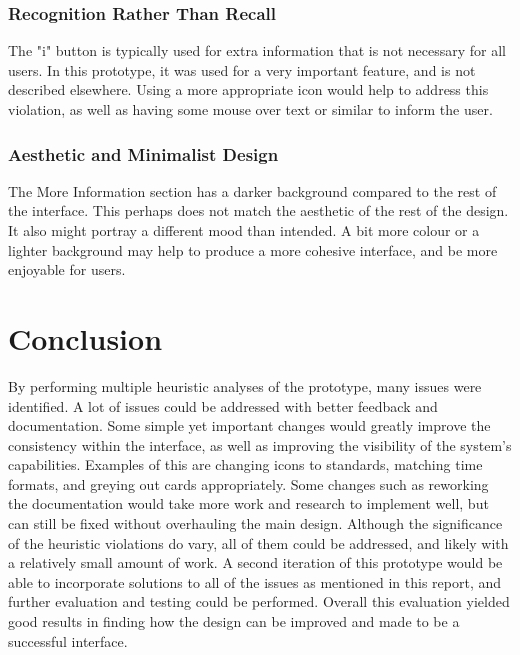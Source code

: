 \documentclass{article}
\begin{document}
\subsubsection{Recognition Rather Than Recall}
The "i" button is typically used for extra information that is not necessary for all users. In this prototype, it was used for a very important feature, and is not described elsewhere. Using a more appropriate icon would help to address this violation, as well as having some mouse over text or similar to inform the user.

\subsubsection{Aesthetic and Minimalist Design}
The More Information section has a darker background compared to the rest of the interface. This perhaps does not match the aesthetic of the rest of the design. It also might portray a different mood than intended. A bit more colour or a lighter background may help to produce a more cohesive interface, and be more enjoyable for users.



\section{Conclusion}
By performing multiple heuristic analyses of the prototype, many issues were identified. A lot of issues could be addressed with better feedback and documentation. Some simple yet important changes would greatly improve the consistency within the interface, as well as improving the visibility of the system's capabilities. Examples of this are changing icons to standards, matching time formats, and greying out cards appropriately. Some changes such as reworking the documentation would take more work and research to implement well, but can still be fixed without overhauling the main design. 
\newline  
\newline \noindent 
Although the significance of the heuristic violations do vary, all of them could be addressed, and likely with a relatively small amount of work. A second iteration of this prototype would be able to incorporate solutions to all of the issues as mentioned in this report, and further evaluation and testing could be performed. Overall this evaluation yielded good results in finding how the design can be improved and made to be a successful interface.
\end{document}
